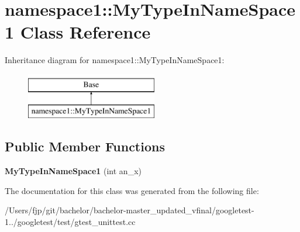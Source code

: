 \hypertarget{classnamespace1_1_1_my_type_in_name_space1}{}\section{namespace1\+:\+:My\+Type\+In\+Name\+Space1 Class Reference}
\label{classnamespace1_1_1_my_type_in_name_space1}
Inheritance diagram for namespace1\+:\+:My\+Type\+In\+Name\+Space1\+:\begin{figure}[H]
\begin{center}
\leavevmode
\includegraphics[height=2.000000cm]{classnamespace1_1_1_my_type_in_name_space1}
\end{center}
\end{figure}
\subsection*{Public Member Functions}
\begin{DoxyCompactItemize}
\item 
\mbox{\label{classnamespace1_1_1_my_type_in_name_space1_a2e4277aa118e9b83045a18392188a0d8}} 
{\bfseries My\+Type\+In\+Name\+Space1} (int an\+\_\+x)
\end{DoxyCompactItemize}


The documentation for this class was generated from the following file\+:\begin{DoxyCompactItemize}
\item 
/\+Users/fjp/git/bachelor/bachelor-\/master\+\_\+updated\+\_\+vfinal/googletest-\/1../googletest/test/gtest\+\_\+unittest.\+cc\end{DoxyCompactItemize}
